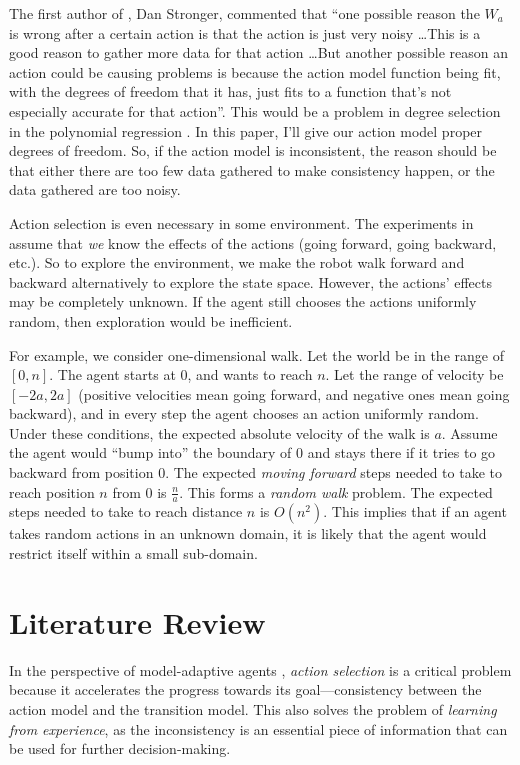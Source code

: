 \documentclass[12pt]{article}
\begin{document}
The first author of \cite{CSJ06}, Dan Stronger, commented that ``one
possible reason the $W_a$ is wrong after a certain action is that the
action is just very noisy \ldots This is a good reason to gather more
data for that action \ldots  But another possible reason  an action
could be causing problems is because the action model function being
fit, with the degrees of freedom that it has, just fits to a function
that's not especially accurate for that action''. This would be a
problem in degree selection in the polynomial regression
\cite{IJAIT08-stronger}. In this paper, I'll give our action model
proper degrees of freedom. So, if the action model is inconsistent,
the reason should be that either there are too few data gathered to
make consistency happen, or the data gathered are too noisy.

Action selection is even necessary in some environment. The
experiments in \cite{CSJ06} assume that \textit{we} know the effects of
the actions (going forward, going backward, etc.).
So to explore the environment, we make the robot walk forward and
backward alternatively to explore the state space. However, 
the actions' effects may be completely unknown.  If the agent still
chooses the actions uniformly random, then exploration would be
inefficient.

For example, we consider one-dimensional walk. Let the world be in the
range of $[0,n]$. The agent starts at 0, and wants to reach $n$. Let
the range of velocity be $[-2a, 2a]$ (positive velocities mean going
forward, and negative ones mean going backward), and in every step the
agent chooses an action uniformly random. Under these conditions, the expected absolute
velocity of the walk is $a$. Assume the agent would ``bump into'' the boundary of
$0$ and stays there if it tries to go backward from position $0$. The
expected \textit{moving forward} steps needed to take to reach
position $n$ from $0$ is $\frac{n}{a}$. This forms a \textit{random walk}
\cite{motwani1995randomized} problem. The expected steps needed to
take to reach distance $n$ is $O(n^2)$. This implies that if an
agent takes random actions in an unknown domain, it is likely that the
agent would restrict itself within a small sub-domain.

\section{Literature Review}

In the perspective of model-adaptive agents \cite{maes1993modeling},
\textit{action selection} is a critical problem because it
accelerates the progress towards its goal---consistency between the action
model and the transition model. This also solves the problem of
\textit{learning from experience}, as the inconsistency is an
essential piece of information that can be used for further decision-making.
\end{document}
